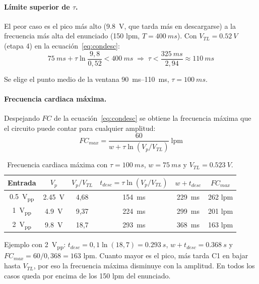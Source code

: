 \documentclass[11pt,letterpaper]{article}
\newcommand{\VTL}{V_{TL}}
\begin{document}
\paragraph{Límite superior de $\tau$.} El peor caso es el pico más alto (\SI{9,8}{V}, que tarda más en descargarse) a la frecuencia más alta del enunciado (150 lpm, $T=\SI{400}{ms}$). Con $\VTL=\SI{0,52}{V}$ (etapa 4) en la ecuación~\eqref{eq:condesc}:
\begin{equation}
\SI{75}{ms}+\tau\ln\frac{9{,}8}{0{,}52}<\SI{400}{ms}\;\Rightarrow\;\tau<\frac{\SI{325}{ms}}{2{,}94}\approx\SI{110}{ms}
\end{equation}

Se elige el punto medio de la ventana \SIrange{90}{110}{ms}, $\tau=\SI{100}{ms}$.

\paragraph{Frecuencia cardiaca máxima.} Despejando $FC$ de la ecuación~\eqref{eq:condesc} se obtiene la frecuencia máxima que el circuito puede contar para cualquier amplitud:
\begin{equation}
FC_{max}=\frac{60}{w+\tau\ln(V_p/\VTL)}\ \text{lpm}
\label{eq:fcmax}
\end{equation}

\begin{table}[H]
\centering
\caption{Frecuencia cardiaca máxima con $\tau=\SI{100}{ms}$, $w=\SI{75}{ms}$ y $\VTL=\SI{0,523}{V}$.}\label{tab:fcmax}
\begin{tabular}{@{}cccccc@{}}
\toprule
Entrada & $V_p$ & $V_p/\VTL$ & $t_{desc}=\tau\ln(V_p/\VTL)$ & $w+t_{desc}$ & $FC_{max}$ \\
\midrule
\SI{0,5}{V_{pp}} & \SI{2,45}{V} & 4,68 & \SI{154}{ms} & \SI{229}{ms} & 262 lpm \\
\SI{1}{V_{pp}} & \SI{4,9}{V} & 9,37 & \SI{224}{ms} & \SI{299}{ms} & 201 lpm \\
\SI{2}{V_{pp}} & \SI{9,8}{V} & 18,7 & \SI{293}{ms} & \SI{368}{ms} & 163 lpm \\
\bottomrule
\end{tabular}
\end{table}

Ejemplo con \SI{2}{V_{pp}}: $t_{desc}=0{,}1\ln(18{,}7)=\SI{0,293}{s}$, $w+t_{desc}=\SI{0,368}{s}$ y $FC_{max}=60/0{,}368=163$ lpm. Cuanto mayor es el pico, más tarda C1 en bajar hasta $\VTL$, por eso la frecuencia máxima disminuye con la amplitud. En todos los casos queda por encima de los 150 lpm del enunciado.
\end{document}
